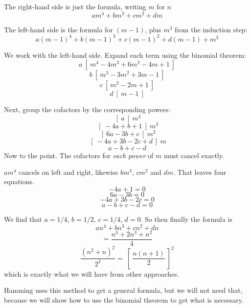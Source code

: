 \documentclass[11pt, oneside]{article}
\begin{document}
The right-hand side is just the formula, writing $m$ for $n$
\[ am^4 + bm^3 + cm^2 + dm \]

The left-hand side is the formula for $(m-1)$, plus $m^3$ from the induction step:
\[ a(m-1)^4 + b(m-1)^3 + c(m-1)^2 + d(m-1) + m^3 \]

We work with the left-hand side.  Expand each term using the binomial theorem:
\[ a \ [ \ m^4 - 4m^3 + 6m^2 - 4m + 1 \ ]  \]
\[ b \ [ \ m^3 - 3m^2 + 3m -1 \ ]  \]
\[ c \ [ \ m^2 - 2m + 1 \ ]  \]
\[ d \ [ \ m - 1 \ ]  \] 

Next, group the cofactors by the corresponding powers:
\[  \ [ \ a \ ] \ m^4 \]
\[  \ [ \ -4a + b + 1 \ ] \ m^3 \]
\[  \ [ \ 6a - 3b + c \ ] \ m^2 \]
\[  \ [ \ -4a + 3b - 2c + d \ ] \ m \]
\[ a - b + c - d \]
Now to the point.  The cofactors for \emph{each power} of $m$ must cancel exactly.

$am^4$ cancels on left and right, likewise $bm^3$, $cm^2$ and $dm$.  That leaves four equations.
\[ -4a + 1 = 0 \]
\[ 6a - 3b = 0 \]
\[ -4a + 3b - 2c = 0 \]
\[ a - b + c - d = 0 \]

We find that $a = 1/4$, $b = 1/2$, $c = 1/4$, $d = 0$.  So then finally the formula is
\[ an^4 + bn^3 + cn^2 + dn \]
\[ = \frac{n^4 + 2n^3 + n^2}{4} \]
\[ \frac{(n^2 + n)^2}{2^2} = \ [ \ \frac{n(n+1)}{2} \ ]^2 \]
which is exactly what we will have from other approaches.

Hamming uses this method to get a general formula, but we will not need that, because we will show how to use the binomial theorem to get what is necessary.
\end{document}
